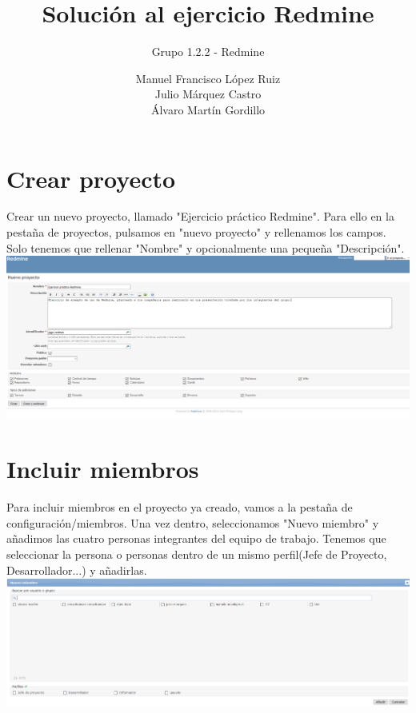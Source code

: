 \documentclass[a4paper,10pt]{scrartcl}
\title{Solución al ejercicio Redmine}
\subtitle{Grupo 1.2.2 - Redmine}
\author{
		Manuel Francisco López Ruiz\\
		Julio Márquez Castro\\
		Álvaro Martín Gordillo\\
		  }
\begin{document}
\clearpage\maketitle
\thispagestyle{empty}
\newpage

\newpage

\tableofcontents

\newpage

\section{Crear proyecto}

Crear un nuevo proyecto, llamado "Ejercicio práctico Redmine". Para ello en la pestaña de proyectos, pulsamos en "nuevo proyecto" y rellenamos los campos. Solo tenemos que rellenar "Nombre" y opcionalmente una pequeña "Descripción".\\


	\includegraphics[width=15cm]{crearProyecto}


\section{Incluir miembros}

Para incluir miembros en el proyecto ya creado, vamos a la pestaña de configuración/miembros. Una vez dentro, seleccionamos "Nuevo miembro" y añadimos las cuatro personas integrantes del equipo de trabajo. Tenemos que seleccionar la persona o personas dentro de un mismo perfil(Jefe de Proyecto, Desarrollador...) y añadirlas.\\


	\includegraphics[width=15cm]{AddMiembro}\\
\end{document}
